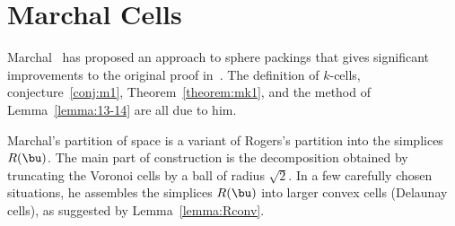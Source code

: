 \section{Marchal Cells}



Marchal~\cite{marchal:2009} has proposed an approach to sphere packings
 that gives significant improvements to the original proof
in~\cite{Hales:2006:DCG}.  The definition of $k$-cells,
conjecture~\ref{conj:m1}, Theorem~\ref{theorem:mk1}, and the method of
Lemma~\ref{lemma:13-14} are all due to him.  
%


Marchal's partition of space is a variant of Rogers's partition into
the simplices $R(\bu)$.  The main part of construction is the
decomposition obtained by truncating the Voronoi cells by a ball of
radius $\sqrt2$.  In a few carefully chosen situations, he assembles
the simplices $R(\bu)$ into larger convex cells (Delaunay cells), as
suggested by Lemma~\ref{lemma:Rconv}.




